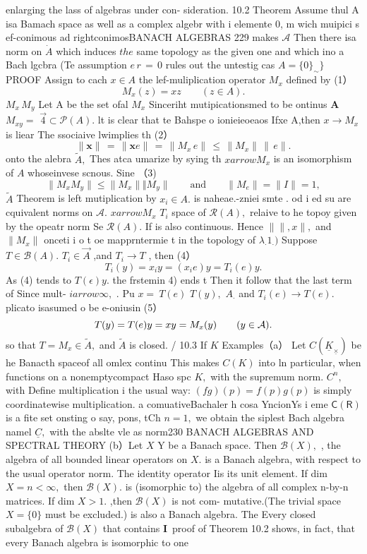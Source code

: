 enlarging the lass of algebras under con- sideration. 10.2 Theorem Assume thul A isa Bamach space as well as a complex algebr with i elemente 0, m wich muipici s ef-conimous ad rightconimosBANACH ALGEBRAS 229 makes $\textstyle{\mathcal{A}}$ Then there isa norm on $\scriptstyle{\dot{A}}$ which induces $t h e$ same topology as the given one and which ino a Bach lgcbra (Te assumption $\scriptstyle e\,r\,=\,0$ rules out the untestig cas $A=\{0\}_{\sim}\}$ PROOF Assign to cach $x\in A$ the lef-muliplication operator $M_{x}$ defined by (1） $$ M_{x}(z)=x z\qquad(z\in A). $$ $M_{x}\,M_{y}$ Let A be the set ofal $\scriptstyle M_{x}$ Sinceriht mutipicationsmed to be ontinus $\boldsymbol{A}$ $M_{x y}=$ ${\vec{4}}\subset{\mathcal{P}}(A).$ lt is clear that te Bahspe o ionieieoeaos Ifxe A,then $x\to M_{x}$ is liear The ssociaive lwimplies th (2） $$ \|{\boldsymbol{x}}\|\,=\,\|{\boldsymbol{x}}e\|\,=\,\|M_{x}\,e\|\,\leq\,\|M_{x}\|\,\|\,e\|. $$ onto the alebra ${\tilde{A}},$ Thes atca umarize by sying th $\textstyle x\! arrow\!M_{x}$ is an isomorphism of $\textstyle A$ whoseinvese scnous. Sine （3) $$ \|M_{x}M_{y}\|\le\|M_{x}\|\Vert M_{y}\|\qquad\mathrm{and}\qquad\|M_{e}\|=\|I\|=1, $$ $\widetilde{A}$ Theorem is left mutiplication by $x_{i}\in A.$ is naheae.-zniei smte . od i ed su are cquivalent norms on ${\mathcal{A}}.$ $x arrow M_{x}$ $\textstyle T_{i}$ space of ${\mathcal{R}}(A),$ relaive to he topoy given by the opeatr norm Se ${\mathcal{R}}(A).$ If is also continuous. Hence $\|\!\|,x\!\|,$ and $\|M_{x}\|$ onceti i o t oe mapprntermie t in the topology of $\lambda_{\cdot}1_{\cdot})$ Suppose $T\in{\mathcal{B}}(A).$ $T_{i}\in\vec{A}$ ,and $T_{i}\to T$ , then (4） $$ T_{i}(y)=x_{i}y=(x_{i}e)y=T_{i}(e)y. $$ As (4) tends to $T(\epsilon)y.$ the frstemin 4) ends t Then it follow that the last term of Since mult- $i arrow\infty,$ . Pu $x=\ T(e)$ $T(y),$ $A_{\cdot}$ and $T_{i}(e)\to T(e).$ plicato isasumed o be e-oniusin (5） $$ T(y)=T(e)y=x y=M_{x}(y)\qquad(y\in{\cal A}). $$ so that $T=M_{x}\in{\tilde{A}},$ and $\widetilde{A}$ is closed. / 10.3 If $\textstyle K$ Examples（a） Let $C(\underline{{K}}_{\underline{{\times}}})$ be he Banacth spaceof all omlex continu This makes $C(K)$ into ln particular, when functions on a nonemptycompact Haso spc $K,$ with the supremum norm. $C^{n},$ with Define multiplication i the usual way: $(f g)(p)=f(p)g(p)$ is simply coordinatewise multiplication. a comuativeBachaler h cosa YncionYs i eme ${\mathsf{C}}({\mathsf{R}})$ is a fite set onsting o say, pons, tCh $n=1,$ we obtain the siplest Bach algebra namel ${\underline{{C}}},$ with the abslte vle as norm230 BANACH ALGEBRAS AND SPECTRAL THEORY (b）Let $X$ Y be a Banach space. Then ${\mathcal{B}}(X),$ , the algebra of all bounded linear operators on $X.$ is a Banach algebra, with respect to the usual operator norm. The identity operator Iis its unit element. If dim $X=n<\infty,$ then ${\mathcal{B}}(X).$ is (isomorphic to) the algebra of all complex n-by-n matrices. If dim $X>1.$ ,then ${\mathcal{B}}(X)$ is not com- mutative.(The trivial space $X=\{0\}$ must be excluded.) is also a Banach algebra. The Every closed subalgebra of ${\mathcal{B}}(X)$ that contains ${\mathbf I}\,$ proof of Theorem 10.2 shows, in fact, that every Banach algebra is isomorphic to one 